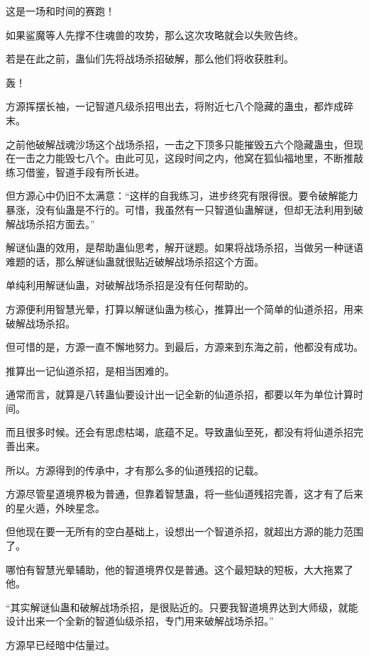 
\begin{this_body}

这是一场和时间的赛跑！

如果鲨魔等人先撑不住魂兽的攻势，那么这次攻略就会以失败告终。

若是在此之前，蛊仙们先将战场杀招破解，那么他们将收获胜利。

轰！

方源挥摆长袖，一记智道凡级杀招甩出去，将附近七八个隐藏的蛊虫，都炸成碎末。

之前他破解战魂沙场这个战场杀招，一击之下顶多只能摧毁五六个隐藏蛊虫，但现在一击之力能毁七八个。由此可见，这段时间之内，他窝在狐仙福地里，不断推敲练习借鉴，智道手段有所长进。

但方源心中仍旧不太满意：“这样的自我练习，进步终究有限得很。要令破解能力暴涨，没有仙蛊是不行的。可惜，我虽然有一只智道仙蛊解谜，但却无法利用到破解战场杀招方面去。”

解谜仙蛊的效用，是帮助蛊仙思考，解开谜题。如果将战场杀招，当做另一种谜语难题的话，那么解谜仙蛊就很贴近破解战场杀招这个方面。

单纯利用解谜仙蛊，对破解战场杀招是没有任何帮助的。

方源便利用智慧光晕，打算以解谜仙蛊为核心，推算出一个简单的仙道杀招，用来破解战场杀招。

但可惜的是，方源一直不懈地努力。到最后，方源来到东海之前，他都没有成功。

推算出一记仙道杀招，是相当困难的。

通常而言，就算是八转蛊仙要设计出一记全新的仙道杀招，都要以年为单位计算时间。

而且很多时候。还会有思虑枯竭，底蕴不足。导致蛊仙至死，都没有将仙道杀招完善出来。

所以。方源得到的传承中，才有那么多的仙道残招的记载。

方源尽管星道境界极为普通，但靠着智慧蛊，将一些仙道残招完善，这才有了后来的星火遁，外映星念。

但他现在要一无所有的空白基础上，设想出一个智道杀招，就超出方源的能力范围了。

哪怕有智慧光晕辅助，他的智道境界仅是普通。这个最短缺的短板，大大拖累了他。

“其实解谜仙蛊和破解战场杀招，是很贴近的。只要我智道境界达到大师级，就能设计出来一个全新的智道仙级杀招，专门用来破解战场杀招。”

方源早已经暗中估量过。


\end{this_body}
